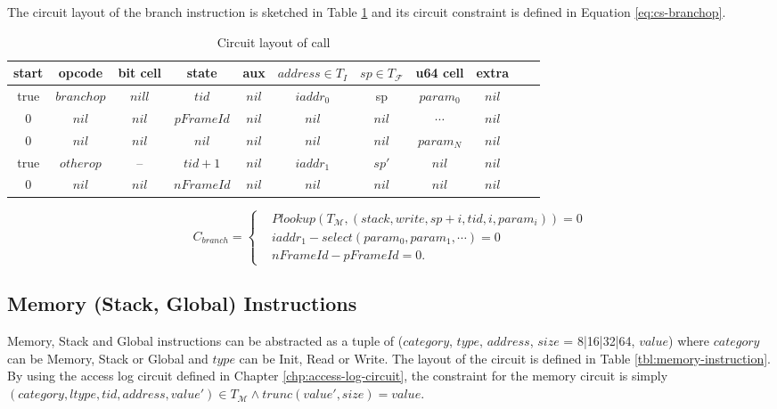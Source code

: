 \smallskip The circuit layout of the branch instruction is sketched in Table \ref{tbl:branch-instruction} and its circuit constraint is defined in Equation \ref{eq:cs-branchop}. 
\begin{table}[!h]
\small
\begin{center}
\caption{Circuit layout of call}
\label{tbl:branch-instruction}
\begin{tabular}{ | c | c | c | c | c | c | c | c | c | c | c | }
  \hline
  start & opcode & bit cell & state & aux & $address \in T_{I}$ & $sp \in T_\mathcal{F}$& u64 cell & extra \\ 
  \hline
   true & $branchop$ & $nill$ & $tid$ & $nil$ & $iaddr_0$ & sp & $param_0$ & $nil$\\ 
 \hline
   0 & $nil$ & $nil$ & $pFrameId$ & $nil$ & $nil$ & $nil$ & $\cdots$ & $nil$\\ 
 \hline
   0 & $nil$ & $nil$ & $nil$ & $nil$ & $nil$ & $nil$ & $param_N$ & $nil$\\ 
 \hline
   true & $otherop$ & -- & $tid + 1$ & $nil$ & $iaddr_1$ & $sp'$ & $nil$ & $nil$\\
 \hline
   0 & $nil$ & $nil$ & $nFrameId$ & $nil$ & $nil$ & $nil$ & $nil$ & $nil$\\ 
 \hline
\end{tabular}

\end{center}
\end{table}
\begin{equation}
    C_{branch} = \begin{cases}
        &Plookup(T_\mathcal{M}, (stack, write, sp+i, tid, i, param_i)) = 0 \\
        &iaddr_1 - select(param_0, param_1, \cdots) = 0 \\
        &nFrameId - pFrameId = 0.
    \end{cases}
\label{eq:cs-branchop}
\end{equation}

\subsection{Memory (Stack, Global) Instructions}
Memory, Stack and Global instructions can be abstracted as a tuple of ($category$, $type$, $address$, $size$ = 8|16|32|64, $value$) where $category$ can be Memory, Stack or Global and $type$ can be Init, Read or Write. The layout of the circuit is defined in Table \ref{tbl:memory-instruction}. By using the access log circuit defined in Chapter \ref{chp:access-log-circuit}, the constraint for the memory circuit is simply $(category, ltype, tid, address, value') \in T_\mathcal{M} \wedge trunc(value', size) = value$.

